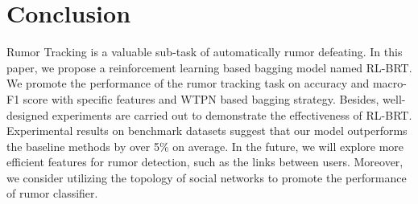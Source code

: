 \section{Conclusion}
\label{sec:conclusion}
Rumor Tracking is a valuable sub-task of automatically rumor defeating. In this paper, we propose a reinforcement learning based bagging model named RL-BRT. We promote the performance of the rumor tracking task on accuracy and macro-F1 score with specific features and WTPN based bagging strategy. Besides, well-designed experiments are carried out to demonstrate the effectiveness of RL-BRT. Experimental results on benchmark datasets suggest that our model outperforms the baseline methods by over 5\% on average. In the future, we will explore more efficient features for rumor detection, such as the links between users. Moreover, we consider utilizing the topology of social networks to promote the performance of rumor classifier.
